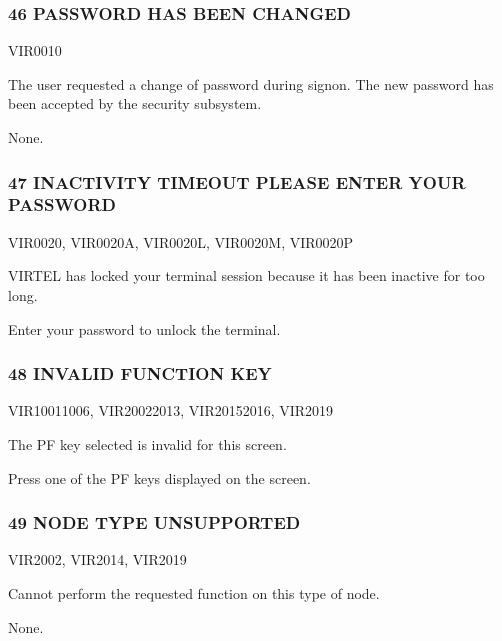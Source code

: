 \documentclass[letterpaper,10pt,english]{sphinxmanual}
\begin{document}
\subsubsection{46 PASSWORD HAS BEEN CHANGED}
\label{\detokenize{messages:password-has-been-changed}}\begin{description}
\sphinxAtStartPar
VIR0010

\sphinxAtStartPar
The user requested a change of password during signon. The new password has been accepted by the security subsystem.

\sphinxAtStartPar
None.

\end{description}


\subsubsection{47 INACTIVITY TIMEOUT PLEASE ENTER YOUR PASSWORD}
\label{\detokenize{messages:inactivity-timeout-please-enter-your-password}}\begin{description}
\sphinxAtStartPar
VIR0020, VIR0020A, VIR0020L, VIR0020M, VIR0020P

\sphinxAtStartPar
VIRTEL has locked your terminal session because it has been inactive for too long.

\sphinxAtStartPar
Enter your password to unlock the terminal.

\end{description}


\subsubsection{48 INVALID FUNCTION KEY}
\label{\detokenize{messages:invalid-function-key}}\begin{description}
\sphinxAtStartPar
VIR1001\sphinxhyphen{}1006, VIR2002\sphinxhyphen{}2013, VIR2015\sphinxhyphen{}2016, VIR2019

\sphinxAtStartPar
The PF key selected is invalid for this screen.

\sphinxAtStartPar
Press one of the PF keys displayed on the screen.

\end{description}


\subsubsection{49 NODE TYPE UNSUPPORTED}
\label{\detokenize{messages:node-type-unsupported}}\begin{description}
\sphinxAtStartPar
VIR2002, VIR2014, VIR2019

\sphinxAtStartPar
Cannot perform the requested function on this type of node.

\sphinxAtStartPar
None.

\end{description}
\end{document}
